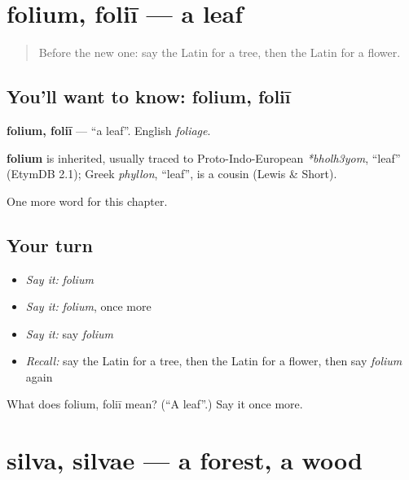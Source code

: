 \section[folium, foliī]{folium, foliī — a leaf}

\label{lesson:LA-C86-folium}



\begin{quote}
Before the new one: say the Latin for a tree, then the Latin for a flower.
\end{quote}

\subsection*{You'll want to know: folium, foliī}
\textbf{folium, foliī} — \textquotedblleft{}a leaf\textquotedblright{}. English \emph{foliage}.

\begin{cousinweb}
\textbf{folium} is inherited, usually traced to Proto-Indo-European \emph{*bholh3yom}, \textquotedblleft{}leaf\textquotedblright{} (EtymDB 2.1); Greek \emph{phyllon}, \textquotedblleft{}leaf\textquotedblright{}, is a cousin (Lewis \& Short).
\end{cousinweb}

\begin{grammarlens}[title={What you've built}]
One more word for this chapter.
\end{grammarlens}

\subsection*{Your turn}
\begin{itemize}
\raggedright
  \item \emph{Say it:} \emph{folium}
  \item \emph{Say it:} \emph{folium}, once more
  \item \emph{Say it:} say \emph{folium}
  \item \emph{Recall:} say the Latin for a tree, then the Latin for a flower, then say \emph{folium} again
\end{itemize}

\begin{tcolorbox}[breakable,colback=teal!4,colframe=teal!35!black,title={Before you move on}]
What does folium, foliī mean? (\textquotedblleft{}A leaf\textquotedblright{}.) Say it once more.
\end{tcolorbox}
\section[silva, silvae]{silva, silvae — a forest, a wood}

